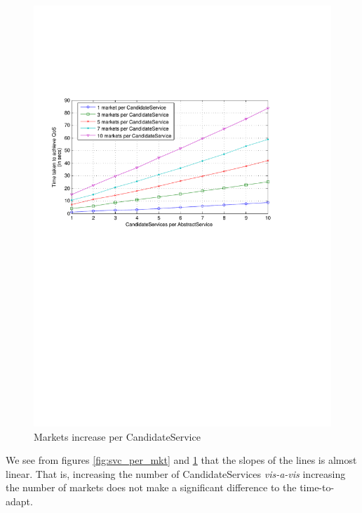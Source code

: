 \documentclass[10pt,journal,compsoc]{IEEEtran}
\begin{document}
\begin{figure}[htbp]
\begin{minipage}{0.4\linewidth}
			\includegraphics[clip, trim=2cm 14cm 6cm 6cm, scale=0.3]{graphs/1_3_5_7_10_mkts_per_svc_scaling.pdf}
			\caption{Markets increase per CandidateService \label{fig:mkt_per_svc}}
		\end{minipage}		
\end{figure}

We see from figures \ref{fig:svc_per_mkt} and \ref{fig:mkt_per_svc} that the slopes of the lines is almost linear. That is, increasing the number of CandidateServices \textit{vis-a-vis} increasing the number of markets does not make a significant difference to the time-to-adapt.
\end{document}
